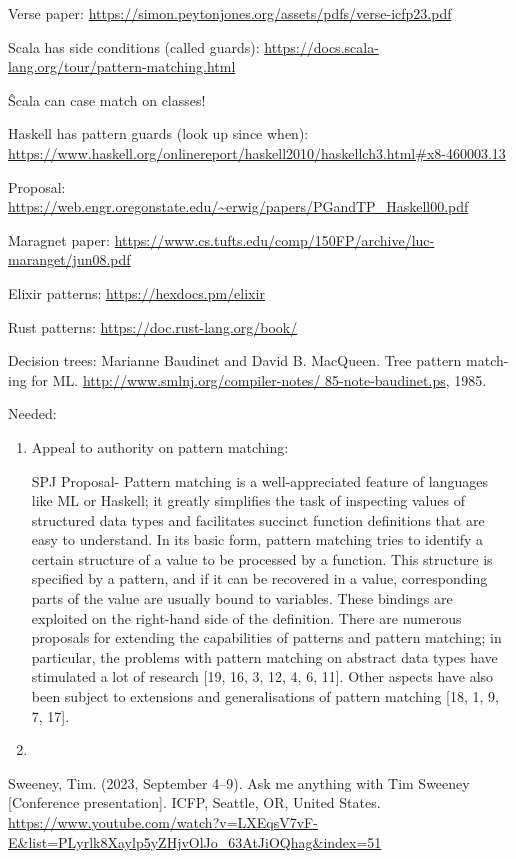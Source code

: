 \documentclass{article}
\begin{document}
Verse paper: 
\url{https://simon.peytonjones.org/assets/pdfs/verse-icfp23.pdf}

Scala has side conditions (called guards): 
\url{https://docs.scala-lang.org/tour/pattern-matching.html}

\^ Scala can case match on classes! 

Haskell has pattern guards (look up since when): 
    \url{https://www.haskell.org/onlinereport/haskell2010/haskellch3.html#x8-460003.13}


Proposal: 
\url{https://web.engr.oregonstate.edu/~erwig/papers/PGandTP_Haskell00.pdf}

Maragnet paper: 
\url{https://www.cs.tufts.edu/comp/150FP/archive/luc-maranget/jun08.pdf}

Elixir patterns: 
\url{https://hexdocs.pm/elixir}

Rust patterns:
\url{https://doc.rust-lang.org/book/}

Decision trees: 
Marianne Baudinet and David B. MacQueen. Tree pattern match-
ing for ML. \url{http://www.smlnj.org/compiler-notes/
85-note-baudinet.ps}, 1985.

Needed: 
\begin{enumerate}
    \item Appeal to authority on pattern matching: 
    
    SPJ Proposal- Pattern matching is a well-appreciated feature of languages
    like ML or Haskell; it greatly simplifies the task of inspecting values of
    structured data types and facilitates succinct function definitions that are
    easy to understand. In its basic form, pattern matching tries to identify a
    certain structure of a value to be processed by a function. This structure
    is specified by a pattern, and if it can be recovered in a value,
    corresponding parts of the value are usually bound to variables. These
    bindings are exploited on the right-hand side of the definition. There are
    numerous proposals for extending the capabilities of patterns and pattern
    matching; in particular, the problems with pattern matching on abstract
    data types have stimulated a lot of research [19, 16, 3, 12, 4, 6, 11].
    Other aspects have also been subject to extensions and generalisations of
    pattern matching [18, 1, 9, 7, 17].
    \item 
\end{enumerate}


Sweeney, Tim. (2023, September 4–9). Ask me anything with Tim Sweeney
[Conference presentation]. ICFP, Seattle, OR, United States.
\url{https://www.youtube.com/watch?v=LXEqsV7vF-E&list=PLyrlk8Xaylp5yZHjvOlJo_63AtJiOQhag&index=51}
\end{document}
